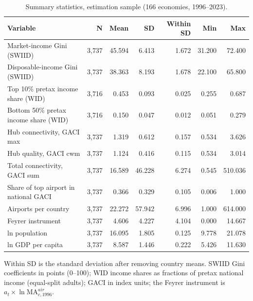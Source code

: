 \begin{table}[H]
\centering
\caption{Summary statistics, estimation sample (166 economies, 1996--2023).}
\label{tab:sumstat}
\begin{threeparttable}
\small
\begin{tabular}{lrrrrrr}
\toprule
Variable & N & Mean & SD & Within SD & Min & Max \\
\midrule
Market-income Gini (SWIID) & 3{,}737 & 45.594 & 6.413 & 1.672 & 31.200 & 72.400 \\
Disposable-income Gini (SWIID) & 3{,}737 & 38.363 & 8.193 & 1.678 & 22.100 & 65.800 \\
Top 10\% pretax income share (WID) & 3{,}716 & 0.453 & 0.093 & 0.025 & 0.255 & 0.687 \\
Bottom 50\% pretax income share (WID) & 3{,}716 & 0.150 & 0.047 & 0.012 & 0.051 & 0.279 \\
Hub connectivity, GACI max & 3{,}737 & 1.319 & 0.612 & 0.157 & 0.534 & 3.626 \\
Hub quality, GACI cwm & 3{,}737 & 1.124 & 0.416 & 0.115 & 0.534 & 3.014 \\
Total connectivity, GACI sum & 3{,}737 & 16.589 & 46.228 & 6.274 & 0.545 & 510.036 \\
Share of top airport in national GACI & 3{,}737 & 0.366 & 0.329 & 0.105 & 0.006 & 1.000 \\
Airports per country & 3{,}737 & 22.272 & 57.942 & 6.996 & 1.000 & 614.000 \\
Feyrer instrument & 3{,}737 & 4.606 & 4.227 & 4.104 & 0.000 & 14.667 \\
ln population & 3{,}737 & 16.095 & 1.805 & 0.125 & 9.778 & 21.078 \\
ln GDP per capita & 3{,}737 & 8.587 & 1.446 & 0.222 & 5.426 & 11.630 \\
\bottomrule
\end{tabular}
\begin{tablenotes}\small
\item Within SD is the standard deviation after removing country means. SWIID Gini coefficients in points (0--100); WID income shares as fractions of pretax national income (equal-split adults); GACI in index units; the Feyrer instrument is $a_t\times\ln\mathrm{MA}^{air}_{c,1996}$.
\end{tablenotes}
\end{threeparttable}
\end{table}
